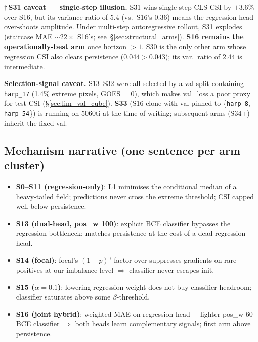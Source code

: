 \noindent$\dagger$\,\textbf{S31 caveat --- single-step illusion.} S31 wins
single-step CLS-CSI by $+3.6\%$ over S16, but its variance ratio of $5.4$
(vs.\ S16's $0.36$) means the regression head over-shoots amplitude.
Under multi-step autoregressive rollout, S31 explodes
(staircase MAE $\sim 22\times$ S16's; see~\S\ref{sec:structural_arms}).
\textbf{S16 remains the operationally-best arm} once horizon $>1$.
S30 is the only other arm whose regression CSI also clears persistence
($0.044 > 0.043$); its var.\ ratio of $2.44$ is intermediate.

\noindent\textbf{Selection-signal caveat.} S13--S32 were all selected by a
val split containing \texttt{harp\_17} (1.4\% extreme pixels, GOES = 0),
which makes val\_loss a poor proxy for test CSI
(\S\ref{sec:lim_val_cube}). \textbf{S33} (S16 clone with val pinned to
\{\texttt{harp\_8}, \texttt{harp\_54}\}) is running on 5060ti at the time
of writing; subsequent arms (S34+) inherit the fixed val.

\subsection*{Mechanism narrative (one sentence per arm cluster)}
\begin{itemize}[leftmargin=14pt,itemsep=2pt,topsep=2pt]
\item \textbf{S0--S11 (regression-only)}: L1 minimises the conditional
      median of a heavy-tailed field; predictions never cross the
      extreme threshold; CSI capped well below persistence.
\item \textbf{S13 (dual-head, pos\_w 100)}: explicit BCE classifier
      bypasses the regression bottleneck; matches persistence at the
      cost of a dead regression head.
\item \textbf{S14 (focal)}: focal's \((1-p)^\gamma\) factor over-suppresses
      gradients on rare positives at our imbalance level $\Rightarrow$
      classifier never escapes init.
\item \textbf{S15 (\(\alpha{=}0.1\))}: lowering regression weight does not
      buy classifier headroom; classifier saturates above some
      \(\beta\)-threshold.
\item \textbf{S16 (joint hybrid)}: weighted-MAE on regression head
      + lighter pos\_w 60 BCE classifier $\Rightarrow$ both heads
      learn complementary signals; first arm above persistence.
\end{itemize}

